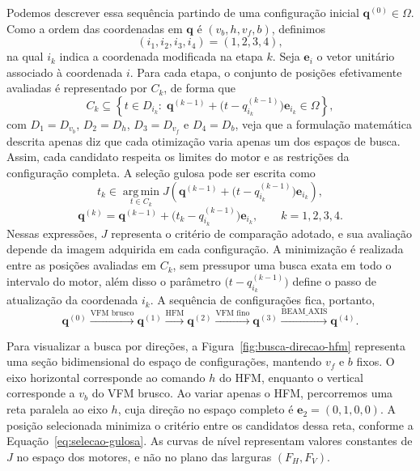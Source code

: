 \documentclass[12pt,a4paper]{article}
\begin{document}
Podemos descrever essa sequência partindo de uma configuração inicial $\mathbf{q}^{(0)}\in\Omega$. Como a ordem das coordenadas em $\mathbf{q}$ é $(v_b,h,v_f,b)$, definimos
\begin{equation}
    (i_1,i_2,i_3,i_4)=(1,2,3,4),
    \label{eq:ordem-gulosa}
\end{equation}
na qual $i_k$ indica a coordenada modificada na etapa $k$. Seja $\mathbf{e}_i$ o vetor unitário associado à coordenada $i$. Para cada etapa, o conjunto de posições efetivamente avaliadas é representado por $C_k$, de forma que
\begin{equation}
    C_k\subseteq\left\{t\in D_{i_k}:\;
    \mathbf{q}^{(k-1)}+
    \bigl(t-q_{i_k}^{(k-1)}\bigr)\mathbf{e}_{i_k}\in\Omega\right\},
    \label{eq:candidatos-gulosos}
\end{equation}
com $D_1=D_{v_b}$, $D_2=D_h$, $D_3=D_{v_f}$ e $D_4=D_b$, veja que a formulação matemática descrita apenas diz que cada otimização varia apenas um dos espaços de busca. Assim, cada candidato respeita os limites do motor e as restrições da configuração completa. A seleção gulosa pode ser escrita como
\begin{equation}
    t_k\in\operatorname*{arg\,min}_{t\in C_k}
    J\left(\mathbf{q}^{(k-1)}+
    \bigl(t-q_{i_k}^{(k-1)}\bigr)\mathbf{e}_{i_k}\right),
    \label{eq:selecao-gulosa}
\end{equation}
\begin{equation}
    \mathbf{q}^{(k)}=\mathbf{q}^{(k-1)}+
    \bigl(t_k-q_{i_k}^{(k-1)}\bigr)\mathbf{e}_{i_k},
    \qquad k=1,2,3,4.
    \label{eq:atualizacao-gulosa}
\end{equation}
Nessas expressões, $J$ representa o critério de comparação adotado, e sua avaliação depende da imagem adquirida em cada configuração. A minimização é realizada entre as posições avaliadas em $C_k$, sem pressupor uma busca exata em todo o intervalo do motor, além disso o parâmetro $\bigl(t-q_{i_k}^{(k-1)}\bigr)$ define o passo de atualização da coordenada $i_k$. A sequência de configurações fica, portanto,
\begin{equation}
    \mathbf{q}^{(0)}
    \xrightarrow{\text{VFM brusco}}\mathbf{q}^{(1)}
    \xrightarrow{\text{HFM}}\mathbf{q}^{(2)}
    \xrightarrow{\text{VFM fino}}\mathbf{q}^{(3)}
    \xrightarrow{\text{BEAM\_AXIS}}\mathbf{q}^{(4)}.
    \label{eq:sequencia-gulosa}
\end{equation}

Para visualizar a busca por direções, a Figura~\ref{fig:busca-direcao-hfm} representa uma seção bidimensional do espaço de configurações, mantendo $v_f$ e $b$ fixos. O eixo horizontal corresponde ao comando $h$ do HFM, enquanto o vertical corresponde a $v_b$ do VFM brusco. Ao variar apenas o HFM, percorremos uma reta paralela ao eixo $h$, cuja direção no espaço completo é $\mathbf{e}_2=(0,1,0,0)$. A posição selecionada minimiza o critério entre os candidatos dessa reta, conforme a Equação~\ref{eq:selecao-gulosa}. As curvas de nível representam valores constantes de $J$ no espaço dos motores, e não no plano das larguras $(F_H,F_V)$.
\end{document}
